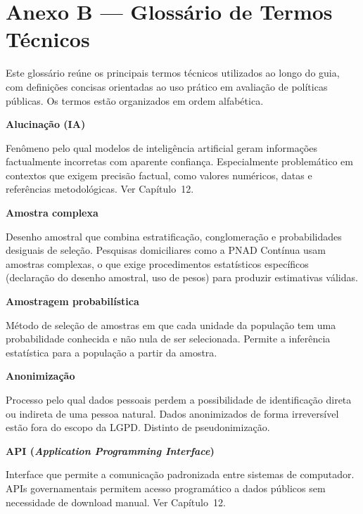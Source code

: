 
\chapter*{Anexo B — Glossário de Termos Técnicos}

Este glossário reúne os principais termos técnicos utilizados ao longo do guia, com definições concisas orientadas ao uso prático em avaliação de políticas públicas. Os termos estão organizados em ordem alfabética.

\medskip

\newcommand{\termo}[2]{%
  \noindent\textbf{#1}\par
  \noindent #2
  \medskip
}


\termo{Alucinação (IA)}{
Fenômeno pelo qual modelos de inteligência artificial geram informações factualmente incorretas com aparente confiança. Especialmente problemático em contextos que exigem precisão factual, como valores numéricos, datas e referências metodológicas. Ver Capítulo~12.
}

\termo{Amostra complexa}{
Desenho amostral que combina estratificação, conglomeração e probabilidades desiguais de seleção. Pesquisas domiciliares como a PNAD Contínua usam amostras complexas, o que exige procedimentos estatísticos específicos (declaração do desenho amostral, uso de pesos) para produzir estimativas válidas.
}

\termo{Amostragem probabilística}{
Método de seleção de amostras em que cada unidade da população tem uma probabilidade conhecida e não nula de ser selecionada. Permite a inferência estatística para a população a partir da amostra.
}

\termo{Anonimização}{
Processo pelo qual dados pessoais perdem a possibilidade de identificação direta ou indireta de uma pessoa natural. Dados anonimizados de forma irreversível estão fora do escopo da LGPD. Distinto de pseudonimização.
}

\termo{API (\textit{Application Programming Interface})}{
Interface que permite a comunicação padronizada entre sistemas de computador. APIs governamentais permitem acesso programático a dados públicos sem necessidade de download manual. Ver Capítulo~12.
}

